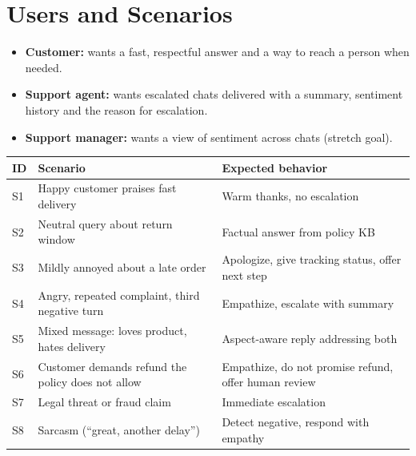 \documentclass[11pt,a4paper]{article}
\begin{document}
\section{Users and Scenarios}
\begin{itemize}
\item \textbf{Customer:} wants a fast, respectful answer and a way to reach a person when needed.
\item \textbf{Support agent:} wants escalated chats delivered with a summary, sentiment history and the reason for escalation.
\item \textbf{Support manager:} wants a view of sentiment across chats (stretch goal).
\end{itemize}

\begin{center}
\begin{tabular}{@{}l p{6.3cm} p{5cm}@{}}
\toprule
\textbf{ID} & \textbf{Scenario} & \textbf{Expected behavior}\\
\midrule
S1 & Happy customer praises fast delivery & Warm thanks, no escalation\\
S2 & Neutral query about return window & Factual answer from policy KB\\
S3 & Mildly annoyed about a late order & Apologize, give tracking status, offer next step\\
S4 & Angry, repeated complaint, third negative turn & Empathize, escalate with summary\\
S5 & Mixed message: loves product, hates delivery & Aspect-aware reply addressing both\\
S6 & Customer demands refund the policy does not allow & Empathize, do not promise refund, offer human review\\
S7 & Legal threat or fraud claim & Immediate escalation\\
S8 & Sarcasm (``great, another delay'') & Detect negative, respond with empathy\\
\bottomrule
\end{tabular}
\end{center}

\end{document}
